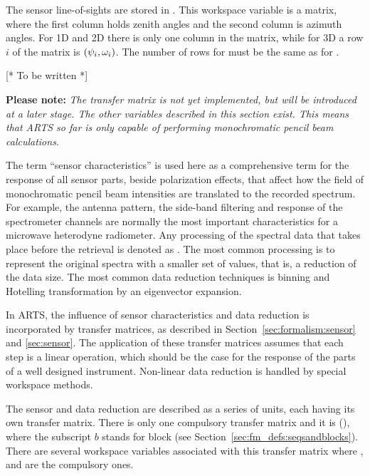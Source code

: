 The sensor line-of-sights are stored in . This
workspace variable is a matrix, where the first column holds zenith
angles and the second column is azimuth angles. For 1D and 2D there is
only one column in the matrix, while for 3D a row $i$ of the matrix is
$(\psi_{i},\omega_{i})$. The number of rows for
 must be the same as for
.


\label{sec:fm_defs:sensorpol}

[* To be written *]



\label{sec:fm_defs:sensorchar}

{\bf Please note:} \emph{The transfer matrix  is not yet
  implemented, but will be introduced at a later stage. The other
  variables described in this section exist. This means that ARTS so
  far is only capable of performing monochromatic pencil beam
  calculations.}

The term ``sensor characteristics'' 
is used here as a
comprehensive term for the response of all sensor parts, beside
polarization effects, that affect how the field of monochromatic
pencil beam intensities are translated to the recorded spectrum. For
example, the antenna pattern, the side-band filtering and response of
the spectrometer channels are normally the most important
characteristics for a microwave heterodyne radiometer. Any processing
of the spectral data that takes place before the retrieval is denoted
as . The most common processing is to represent
the original spectra with a smaller set of values, that is, a
reduction of the data size. The most common data reduction techniques
is binning and Hotelling transformation by an eigenvector expansion.

In ARTS, the influence of sensor characteristics and data reduction is
incorporated by transfer matrices, as
described in Section~\ref{sec:formalism:sensor} and \ref{sec:sensor}.
The application of these transfer matrices assumes that each step is a
linear operation, which should be the case for the response of the
parts of a well designed instrument. Non-linear data reduction is
handled by special workspace methods.

The sensor and data reduction are described as a series of units, each
having its own transfer matrix.  There is only one compulsory transfer
matrix and it is  (), where the subscript $b$
stands for block (see Section~\ref{sec:fm_defs:seqsandblocks}). There
are several workspace variables associated with this transfer matrix
where ,  and
 are the compulsory ones.

